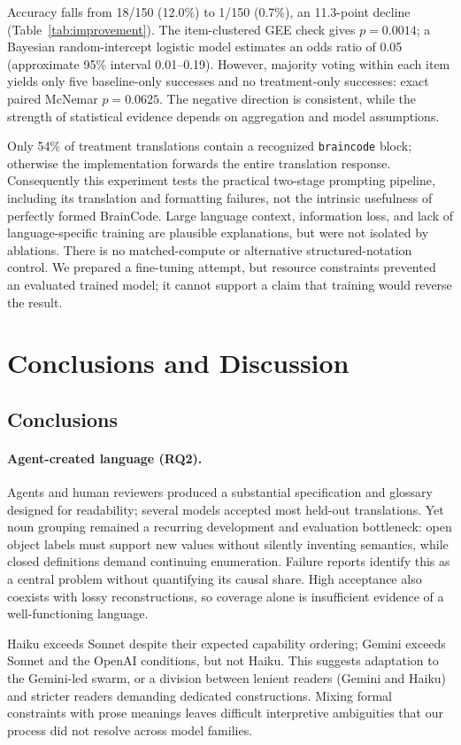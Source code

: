 \documentclass[11pt]{article}
\newcommand{\bc}{BrainCode}
\newcommand{\code}[1]{\texttt{#1}}
\begin{document}
Accuracy falls from 18/150 (12.0\%) to 1/150 (0.7\%), an 11.3-point decline (Table~\ref{tab:improvement}). The item-clustered GEE check gives $p=0.0014$; a Bayesian random-intercept logistic model estimates an odds ratio of 0.05 (approximate 95\% interval 0.01--0.19). However, majority voting within each item yields only five baseline-only successes and no treatment-only successes: exact paired McNemar $p=0.0625$. The negative direction is consistent, while the strength of statistical evidence depends on aggregation and model assumptions.

Only 54\% of treatment translations contain a recognized \code{braincode} block; otherwise the implementation forwards the entire translation response. Consequently this experiment tests the practical two-stage prompting pipeline, including its translation and formatting failures, not the intrinsic usefulness of perfectly formed \bc{}. Large language context, information loss, and lack of language-specific training are plausible explanations, but were not isolated by ablations. There is no matched-compute or alternative structured-notation control. We prepared a fine-tuning attempt, but resource constraints prevented an evaluated trained model; it cannot support a claim that training would reverse the result.

\section{Conclusions and Discussion}
\subsection{Conclusions}
\paragraph{Agent-created language (RQ2).}
Agents and human reviewers produced a substantial specification and glossary designed for readability; several models accepted most held-out translations. Yet noun grouping remained a recurring development and evaluation bottleneck: open object labels must support new values without silently inventing semantics, while closed definitions demand continuing enumeration. Failure reports identify this as a central problem without quantifying its causal share. High acceptance also coexists with lossy reconstructions, so coverage alone is insufficient evidence of a well-functioning language.

Haiku exceeds Sonnet despite their expected capability ordering; Gemini exceeds Sonnet and the OpenAI conditions, but not Haiku. This suggests adaptation to the Gemini-led swarm, or a division between lenient readers (Gemini and Haiku) and stricter readers demanding dedicated constructions. Mixing formal constraints with prose meanings leaves difficult interpretive ambiguities that our process did not resolve across model families.
\end{document}
